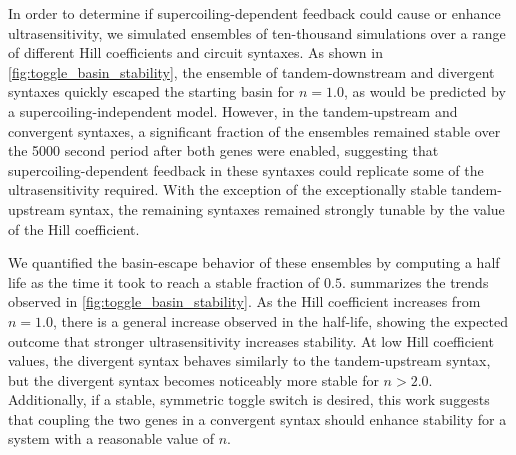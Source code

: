 \documentclass[11pt]{article}
\begin{document}
In order to determine if supercoiling-dependent feedback could cause or enhance ultrasensitivity, we simulated ensembles of ten-thousand simulations over a range of different Hill coefficients and circuit syntaxes. As shown in \cref{fig:toggle_basin_stability}, the ensemble of tandem-downstream and divergent syntaxes quickly escaped the starting basin for \(n = 1.0\), as would be predicted by a supercoiling-independent model. However, in the tandem-upstream and convergent syntaxes, a significant fraction of the ensembles remained stable over the 5000 second period after both genes were enabled, suggesting that supercoiling-dependent feedback in these syntaxes could replicate some of the ultrasensitivity required. With the exception of the exceptionally stable tandem-upstream syntax, the remaining syntaxes remained strongly tunable by the value of the Hill coefficient.

We quantified the basin-escape behavior of these ensembles by computing a half life as the time it took to reach a stable fraction of \(0.5\).  summarizes the trends observed in \cref{fig:toggle_basin_stability}. As the Hill coefficient increases from \(n = 1.0\), there is a general increase observed in the half-life, showing the expected outcome that stronger ultrasensitivity increases stability. At low Hill coefficient values, the divergent syntax behaves similarly to the tandem-upstream syntax, but the divergent syntax becomes noticeably more stable for \(n > 2.0\). Additionally, if a stable, symmetric toggle switch is desired, this work suggests that coupling the two genes in a convergent syntax should enhance stability for a system with a reasonable value of \(n\).
\end{document}
